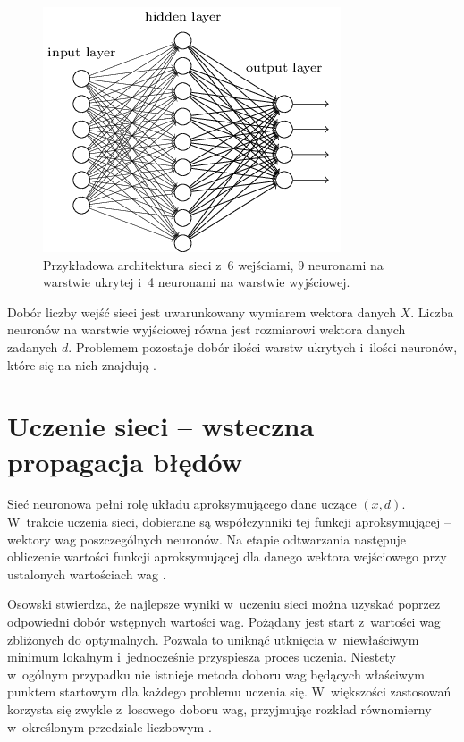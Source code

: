 \documentclass[a4paper, 12pt, oneside]{report}
\begin{document}
\begin{figure}[htp]
\centering
\includegraphics[scale=0.8]{rys/siec_neuronowa.png}
\caption{Przykładowa architektura sieci z~6 wejściami, 9 neuronami na warstwie ukrytej i~4 neuronami na warstwie wyjściowej\protect\footnotemark.}
\end{figure}

Dobór liczby wejść sieci jest uwarunkowany wymiarem wektora danych $X$. Liczba neuronów na warstwie wyjściowej równa jest rozmiarowi wektora danych zadanych $d$. Problemem pozostaje dobór ilości warstw ukrytych i~ilości neuronów, które się na nich znajdują \cite{Osowski96}.

\section{Uczenie sieci -- wsteczna propagacja błędów}
\label{sec:uczenie_sieci}

Sieć neuronowa pełni rolę układu aproksymującego dane uczące $(x, d)$. W~trakcie uczenia sieci, dobierane są współczynniki tej funkcji aproksymującej -- wektory wag poszczególnych neuronów. Na etapie odtwarzania następuje obliczenie wartości funkcji aproksymującej dla danego wektora wejściowego przy ustalonych wartościach wag \cite{Osowski96}.

Osowski stwierdza, że najlepsze wyniki w~uczeniu sieci można uzyskać poprzez odpowiedni dobór wstępnych wartości wag. Pożądany jest start z~wartości wag zbliżonych do optymalnych. Pozwala to uniknąć utknięcia w~niewłaściwym minimum lokalnym i~jednocześnie przyspiesza proces uczenia. Niestety w~ogólnym przypadku nie istnieje metoda doboru wag będących właściwym punktem startowym dla każdego problemu uczenia się. W~większości zastosowań korzysta się zwykle z~losowego doboru wag, przyjmując rozkład równomierny w~określonym przedziale liczbowym \cite{Osowski96}.
\end{document}
